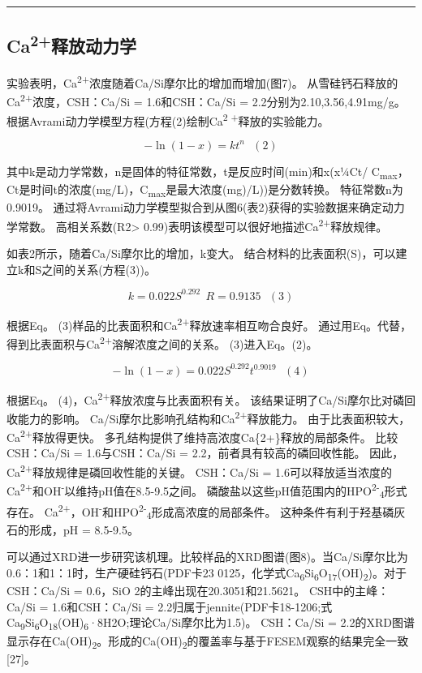 \documentclass[11pt]{article}
\begin{document}
\noindent\rule{\textwidth}{0.5pt}
\subsection{Ca\textsuperscript{2+}释放动力学}
\label{sec:orgede5c8c}
实验表明，Ca\textsuperscript{2+}浓度随着Ca/Si摩尔比的增加而增加(图7)。 从雪硅钙石释放的
Ca\textsuperscript{2+}浓度，CSH：Ca/Si = 1.6和CSH：Ca/Si = 2.2分别为2.10,3.56,4.91mg/g。
根据Avrami动力学模型方程(方程(2)绘制Ca\textsuperscript{2 +}释放的实验能力。\cite{demirkıran07_dissol_kinet_ulexit_perch_acid_solut}

\[-\ln(1-x) = kt^{n} \ \ \ (2)\]

其中k是动力学常数，n是固体的特征常数，t是反应时间(min)和x(x¼Ct/ C\textsubscript{max}，Ct是时间t的浓度(mg/L)，C\textsubscript{max}是最大浓度(mg)/L))是分数转换。 特征常数n为0.9019。 通过将Avrami动力学模型拟合到从图6(表2)获得的实验数据来确定动力学常数。 高相关系数(R2> 0.99)表明该模型可以很好地描述Ca\textsuperscript{2+}释放规律。


如表2所示，随着Ca/Si摩尔比的增加，k变大。 结合材料的比表面积(S)，可以建立k和S之间的关系(方程(3))。

\[k = 0.022S^{0.292} \ \ R = 0.9135 \ \ \ (3)\]

根据Eq。 (3)样品的比表面积和Ca\textsuperscript{2+}释放速率相互吻合良好。 通过用Eq。代替，得到比表面积与Ca\textsuperscript{2+}溶解浓度之间的关系。 (3)进入Eq。(2)。

\[-\ln(1-x) = 0.022S^{0.292}t^{0.9019} \ \ \ (4)\]

根据Eq。 (4)，Ca\textsuperscript{2+}释放浓度与比表面积有关。 该结果证明了Ca/Si摩尔比对磷回收能力的影响。 Ca/Si摩尔比影响孔结构和Ca\textsuperscript{2+}释放能力。 由于比表面积较大，Ca\textsuperscript{2+}释放得更快。 多孔结构提供了维持高浓度Ca\{2+\}释放的局部条件。 比较CSH：Ca/Si = 1.6与CSH：Ca/Si = 2.2，前者具有较高的磷回收性能。 因此，Ca\textsuperscript{2+}释放规律是磷回收性能的关键。 CSH：Ca/Si = 1.6可以释放适当浓度的Ca\textsuperscript{2+}和OH\textsuperscript{-}以维持pH值在8.5-9.5之间。 磷酸盐以这些pH值范围内的HPO\textsuperscript{2-}\textsubscript{4}形式存在。\cite{liu12_remov_high_concen_phosp_by_calcit} Ca\textsuperscript{2+}，OH\textsuperscript{-}和HPO\textsuperscript{2-}\textsubscript{4}形成高浓度的局部条件。 这种条件有利于羟基磷灰石的形成，pH = 8.5-9.5。


可以通过XRD进一步研究该机理。比较样品的XRD图谱(图8)。当Ca/Si摩尔比为0.6：1和1：1时，生产硬硅钙石(PDF卡23 0125，化学式Ca\textsubscript{6}Si\textsubscript{6}O\textsubscript{17}(OH)\textsubscript{2})。对于CSH：Ca/Si = 0.6，SiO 2的主峰出现在20.3051和21.5621。 CSH中的主峰：Ca/Si = 1.6和CSH：Ca/Si = 2.2归属于jennite(PDF卡18-1206;式Ca\textsubscript{9}Si\textsubscript{6}O\textsubscript{18}(OH)\textsubscript{6}·8H2O;理论Ca/Si摩尔比为1.5)。 CSH：Ca/Si = 2.2的XRD图谱显示存在Ca(OH)\textsubscript{2}。形成的Ca(OH)\textsubscript{2}的覆盖率与基于FESEM观察的结果完全一致[27]。
\end{document}
